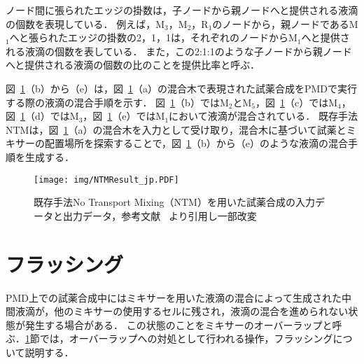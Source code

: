 ノード間に張られたエッジの掛数は，子ノードから親ノードへと提供される液滴の個数を表現している．
例えば，M$_3$，M$_2$，R$_1$のノードから，親ノードであるM$_1$へと張られたエッジの掛数の2，1，1は，それぞれのノードからM$_1$へと提供される液滴の個数を表している．
また，この2:1:1のような子ノードから親ノードへと提供される液滴の個数の比のことを提供比率と呼ぶ．

図~\ref{fig:NTM}（b）から（e）は，図~\ref{fig:NTM}（a）の混合木で表現された試薬合成をPMDで実行する際の液滴の混合手順を示す．
図~\ref{fig:NTM}（b）ではM$_2$とM$_5$，図~\ref{fig:NTM}（c）ではM$_4$，図~\ref{fig:NTM}（d）ではM$_3$，図~\ref{fig:NTM}（e）ではM$_1$において液滴が混合されている．
既存手法NTMは，図~\ref{fig:NTM}（a）の混合木を入力として受け取り，混合木に基づいて試薬とミキサーの配置場所を探索することで，図~\ref{fig:NTM}（b）から（e）のような液滴の混合手順を生成する．

\begin{figure}[tbp]
    \centering\texttt{[image: img/NTMResult\_jp.PDF]}
    \caption{既存手法No Transport Mixing（NTM）を用いた試薬合成の入力データと出力データ，参考文献~\cite{4} より引用し一部改変}\label{fig:NTM}
\end{figure}


\section{フラッシング}
\label{sec:flushing}
    PMD上での試薬合成中にはミキサーを用いた液滴の混合によって生成された中間液滴が，他のミキサーの使用するセルに残され，液滴の混合を進められない状態が発生する場合がある．
    この状態のことをミキサーのオーバーラップと呼ぶ．\ref{sec:flushing}節では，オーバーラップへの対処として行われる操作，フラッシングについて説明する．

